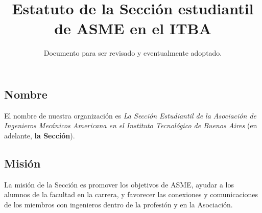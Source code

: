 \documentclass[12pt]{article}
\title{Estatuto de la Sección estudiantil de ASME en el ITBA}
\author{Documento para ser revisado y eventualmente adoptado.}
\begin{document}
\maketitle

\subsection*{Nombre}
El nombre de nuestra organización es \textit{La Sección Estudiantil de la Asociación de Ingenieros Mecánicos Americana en el Instituto Tecnológico de Buenos Aires} (en adelante, \textbf{la Sección}). 
\subsection*{Misión}
La misión de la Sección es promover los objetivos de ASME, ayudar a los alumnos de la facultad en la carrera, y favorecer las conexiones y comunicaciones de los miembros con ingenieros dentro de la profesión y en la Asociación. 




%
\end{document}
